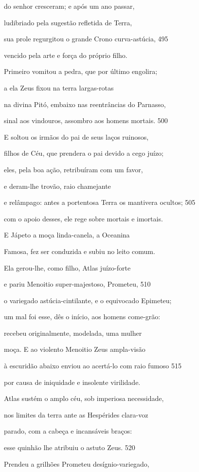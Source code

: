 do senhor cresceram; e após um ano passar,

ludibriado pela sugestão refletida de Terra,

sua prole regurgitou o grande Crono curva-astúcia, \num{495}

vencido pela arte e força do próprio filho.

Primeiro vomitou a pedra, que por último engolira;

a ela Zeus fixou na terra largas-rotas

na divina Pitó, embaixo nas reentrâncias do Parnasso,

sinal aos vindouros, assombro aos homens mortais. \num{500}

\quad{}E soltou os irmãos do pai de seus laços ruinosos,

filhos de Céu, que prendera o pai devido a cego juízo;

eles, pela boa ação, retribuíram com um favor,

e deram-lhe trovão, raio chamejante

e relâmpago: antes a portentosa Terra os mantivera ocultos; \num{505}

com o apoio desses, ele rege sobre mortais e imortais.

\quad{}E Jápeto a moça linda-canela, a Oceanina

Famosa, fez ser conduzida e subiu no leito comum.

Ela gerou-lhe, como filho, Atlas juízo-forte

e pariu Menoitio super-majestoso, Prometeu, \num{510}

o variegado astúcia-cintilante, e o equivocado Epimeteu;

um mal foi esse, dês o início, aos homens come-grão:

recebeu originalmente, modelada, uma mulher

moça. E ao violento Menoitio Zeus ampla-visão

à escuridão abaixo enviou ao acertá-lo com raio fumoso \num{515}

por causa de iniquidade e insolente virilidade.

Atlas sustém o amplo céu, sob imperiosa necessidade,

nos limites da terra ante as Hespérides clara-voz

parado, com a cabeça e incansáveis braços:

esse quinhão lhe atribuiu o astuto Zeus. \num{520}

Prendeu a grilhões Prometeu desígnio-variegado,

